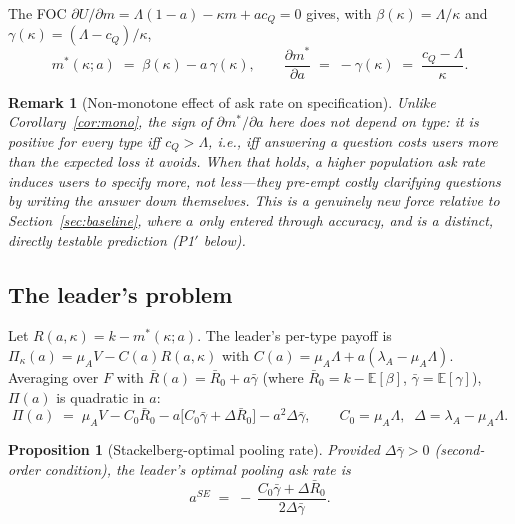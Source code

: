 \documentclass[11pt]{article}
\newtheorem{proposition}{Proposition}
\newtheorem{remark}{Remark}
\begin{document}
The FOC $\partial U/\partial m = \Lambda(1-a) - \kappa m + ac_Q = 0$ gives, with
$\beta(\kappa)=\Lambda/\kappa$ and $\gamma(\kappa)=(\Lambda-c_Q)/\kappa$,
\[
m^*(\kappa;a) \;=\; \beta(\kappa) - a\,\gamma(\kappa), \qquad
\frac{\partial m^*}{\partial a} \;=\; -\gamma(\kappa) \;=\; \frac{c_Q-\Lambda}{\kappa}.
\]

\begin{remark}[Non-monotone effect of ask rate on specification]
Unlike Corollary~\ref{cor:mono}, the sign of $\partial m^*/\partial a$ here does
not depend on type: it is positive for \emph{every} type iff $c_Q > \Lambda$, i.e.,
iff answering a question costs users more than the expected loss it avoids. When
that holds, a higher population ask rate induces users to specify \emph{more}, not
less---they pre-empt costly clarifying questions by writing the answer down
themselves. This is a genuinely new force relative to Section~\ref{sec:baseline},
where $a$ only entered through accuracy, and is a distinct, directly testable
prediction (P1$'$ below).
\end{remark}

\subsection{The leader's problem}

Let $R(a,\kappa)=k-m^*(\kappa;a)$. The leader's per-type payoff is
$\Pi_\kappa(a) = \mu_A V - C(a)R(a,\kappa)$ with $C(a)=\mu_A\Lambda + a(\lambda_A -
\mu_A\Lambda)$. Averaging over $F$ with $\bar R(a) = \bar R_0 + a\bar\gamma$
(where $\bar R_0=k-\mathbb{E}[\beta]$, $\bar\gamma=\mathbb{E}[\gamma]$), $\Pi(a)$
is quadratic in $a$:
\[
\Pi(a) \;=\; \mu_A V - C_0\bar R_0 - a\big[C_0\bar\gamma + \Delta\bar R_0\big] -
a^2\Delta\bar\gamma, \qquad C_0=\mu_A\Lambda,\;\; \Delta=\lambda_A-\mu_A\Lambda.
\]

\begin{proposition}[Stackelberg-optimal pooling rate]\label{prop:aSE}
Provided $\Delta\bar\gamma>0$ (second-order condition), the leader's optimal
pooling ask rate is
\[
a^{SE} \;=\; -\,\frac{C_0\bar\gamma + \Delta \bar R_0}{2\Delta\bar\gamma}.
\]
\end{proposition}
\end{document}
